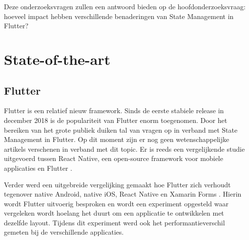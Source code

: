 Deze onderzoeksvragen zullen een antwoord bieden op de hoofdonderzoeksvraag: hoeveel impact hebben verschillende benaderingen van State Management in Flutter?


\section{State-of-the-art}
\label{sec:state-of-the-art}
\subsection*{Flutter}
Flutter is een relatief nieuw framework. Sinds de eerste stabiele release in december 2018 is de populariteit
van Flutter enorm toegenomen. Door het bereiken van het grote publiek duiken tal van vragen op in verband met 
State Management in Flutter. Op dit moment zijn er nog geen wetenschappelijke artikels verschenen in verband met dit topic.
Er is reeds een vergelijkende studie uitgevoerd tussen React Native, een open-source framework voor mobiele applicaties en Flutter \autocite{Wu2018}.

Verder werd een uitgebreide vergelijking gemaakt hoe Flutter zich verhoudt tegenover native Android, native iOS,
React Native en Xamarin Forms \autocite{Coninck2019}.
Hierin wordt Flutter uitvoerig besproken en wordt een experiment opgesteld waar vergeleken wordt hoelang het duurt
om een applicatie te ontwikkelen met dezelfde layout. Tijdens dit experiment werd ook het performantieverschil gemeten bij de verschillende applicaties. 

%


